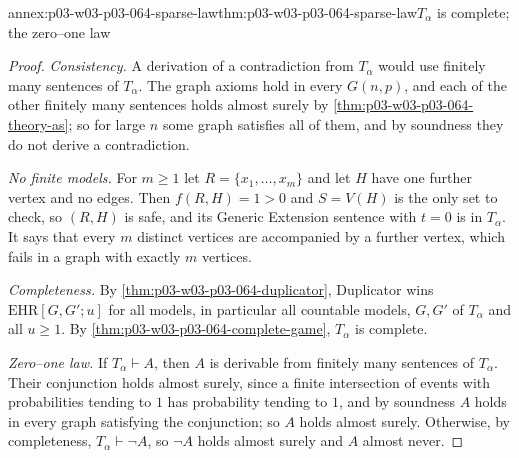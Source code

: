 \begin{annexitem}{annex:p03-w03-p03-064-sparse-law}{thm:p03-w03-p03-064-sparse-law}{\(T_\alpha\) is complete; the zero--one law}
\begin{proof}
\emph{Consistency.}  A derivation of a contradiction from \(T_\alpha\) would
use finitely many sentences of \(T_\alpha\).  The graph axioms hold in every
\(G(n,p)\), and each of the other finitely many sentences holds almost surely
by \cref{thm:p03-w03-p03-064-theory-as}; so for large \(n\) some graph
satisfies all of them, and by soundness they do not derive a contradiction.

\emph{No finite models.}  For \(m\geq1\) let \(R=\{x_1,\ldots,x_m\}\) and let
\(H\) have one further vertex and no edges.  Then \(f(R,H)=1>0\) and
\(S=V(H)\) is the only set to check, so \((R,H)\) is safe, and its Generic
Extension sentence with \(t=0\) is in \(T_\alpha\).  It says that every \(m\)
distinct vertices are accompanied by a further vertex, which fails in a graph
with exactly \(m\) vertices.

\emph{Completeness.}  By \cref{thm:p03-w03-p03-064-duplicator}, Duplicator
wins \(\mathrm{EHR}[G,G';u]\) for all models, in particular all countable
models, \(G,G'\) of \(T_\alpha\) and all \(u\geq1\).  By
\cref{thm:p03-w03-p03-064-complete-game}, \(T_\alpha\) is complete.

\emph{Zero--one law.}  If \(T_\alpha\vdash A\), then \(A\) is derivable from
finitely many sentences of \(T_\alpha\).  Their conjunction holds almost
surely, since a finite intersection of events with probabilities tending to
\(1\) has probability tending to \(1\), and by soundness \(A\) holds in every
graph satisfying the conjunction; so \(A\) holds almost surely.  Otherwise,
by completeness, \(T_\alpha\vdash\neg A\), so \(\neg A\) holds almost surely
and \(A\) almost never.
\end{proof}
\end{annexitem}

